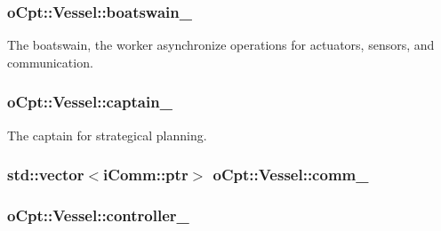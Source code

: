 \subsubsection[{\texorpdfstring{boatswain\+\_\+}{boatswain_}}]{ o\+Cpt\+::\+Vessel\+::boatswain\+\_\+\hspace{0.3cm}{\ttfamily [protected]}}\hypertarget{classo_cpt_1_1_vessel_a7d23ca83ab0b60ced457b6c08ff8f171}{}\label{classo_cpt_1_1_vessel_a7d23ca83ab0b60ced457b6c08ff8f171}


The boatswain, the worker asynchronize operations for actuators, sensors, and communication. 

\subsubsection[{\texorpdfstring{captain\+\_\+}{captain_}}]{ o\+Cpt\+::\+Vessel\+::captain\+\_\+\hspace{0.3cm}{\ttfamily [protected]}}\hypertarget{classo_cpt_1_1_vessel_ae135ec01edc448d7973726a78d2a677a}{}\label{classo_cpt_1_1_vessel_ae135ec01edc448d7973726a78d2a677a}


The captain for strategical planning. 

\subsubsection[{\texorpdfstring{comm\+\_\+}{comm_}}]{\setlength{\rightskip}{0pt plus 5cm}std\+::vector$<${\bf i\+Comm\+::ptr}$>$ o\+Cpt\+::\+Vessel\+::comm\+\_\+\hspace{0.3cm}{\ttfamily [protected]}}\hypertarget{classo_cpt_1_1_vessel_a0f09f5d34963356faa3834b379e8081e}{}\label{classo_cpt_1_1_vessel_a0f09f5d34963356faa3834b379e8081e}
\subsubsection[{\texorpdfstring{controller\+\_\+}{controller_}}]{ o\+Cpt\+::\+Vessel\+::controller\+\_\+\hspace{0.3cm}{\ttfamily [protected]}}\hypertarget{classo_cpt_1_1_vessel_a5416b2e16fd2457921fb6c15b45998e0}{}\label{classo_cpt_1_1_vessel_a5416b2e16fd2457921fb6c15b45998e0}


